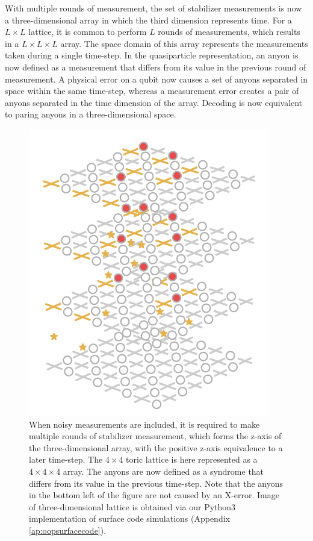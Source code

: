With multiple rounds of measurement, the set of stabilizer measurements is now a three-dimensional array in which the third dimension represents time. For a $L\times L$ lattice, it is common to perform $L$ rounds of measurements, which results in a $L \times L \times L$ array. The space domain of this array represents the measurements taken during a single time-step. In the quasiparticle representation, an anyon is now defined as a measurement that differs from its value in the previous round of measurement. A physical error on a qubit now causes a set of anyons separated in space within the same time-step, whereas a measurement error creates a pair of anyons separated in the time dimension of the array. Decoding is now equivalent to paring anyons in a three-dimensional space. 

\begin{figure}[htbp]
  \centering
  \includegraphics[width=.5\textwidth]{fig/3dlattice.pdf}
  \hspace{1cm}
  \caption{When noisy measurements are included, it is required to make multiple rounds of stabilizer measurement, which forms the z-axis of the three-dimensional array, with the positive z-axis equivalence to a later time-step. The $4\times 4$ toric lattice is here represented as a $4\times 4\times 4$ array. The anyons are now defined as a syndrome that differs from its value in the previous time-step. Note that the anyons in the bottom left of the figure are not caused by an X-error. Image of three-dimensional lattice is obtained via our Python3 implementation of surface code simulations (Appendix \ref{ap:oopsurfacecode}). }
\end{figure}

